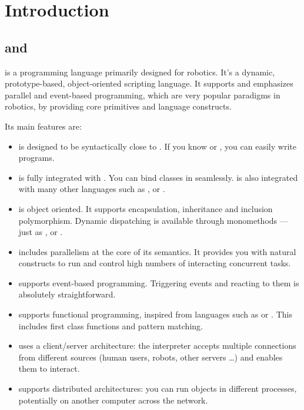 \chapter{Introduction}
\ifx \Htmltrue\else
\fi


\section{\urbi and \us}

\us is a programming language primarily designed for robotics. It's a
dynamic, prototype-based, object-oriented scripting language. It
supports and emphasizes parallel and event-based programming, which
are very popular paradigms in robotics, by providing core primitives
and language constructs.

Its main features are:
\begin{itemize}
\item \us is designed to be syntactically close to \Cxx. If you know
  \C or \Cxx, you can easily write \us programs.
\item \us is fully integrated with \Cxx. You can bind \Cxx classes
  in \us seamlessly. \us is also integrated with many other
  languages such as \java, \matlab or \python.
\item \us is object oriented. It supports encapsulation, inheritance
  and inclusion polymorphism. Dynamic dispatching is available through
  monomethods --- just as \Cxx, \Cs or \java.
\item \us includes parallelism at the core of its semantics. It
  provides you with natural constructs to run and control high numbers
  of interacting concurrent tasks.
\item \us supports event-based programming. Triggering events and
  reacting to them is absolutely straightforward.
\item \us supports functional programming, inspired from languages
  such as \lisp or \caml. This includes first class functions and
  pattern matching.
\item \us uses a client/server architecture: the interpreter accepts
  multiple connections from different sources (human users, robots,
  other servers \ldots) and enables them to interact.
\item \us supports distributed architectures: you can run objects in
  different processes, potentially on another computer across the
  network.
\end{itemize}


